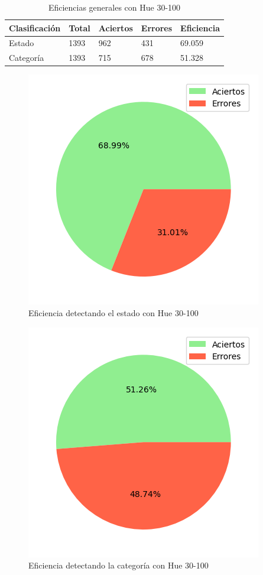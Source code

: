 \begin{table}[h!]
\centering
\begin{tabular}{|l|l|l|l|l|}
\hline 
\textbf{Clasificación} & \textbf{Total} & \textbf{Aciertos} & \textbf{Errores} & \textbf{Eficiencia} \\
\hline
Estado & 1393 & 962 & 431 & 69.059 \\
\hline 
Categoría & 1393 & 715 & 678 & 51.328 \\
\hline 
\end{tabular}
\caption{Eficiencias generales con Hue 30-100}
\label{table:efficiency_general_30_100}
\end{table}

\captionsetup[figure]{skip=-10pt}

\begin{figure}[H]
\centering
\includegraphics[scale=0.6]{images/result_global_state_30_100.png}
\caption{Eficiencia detectando el estado con Hue 30-100}
\label{img:efficiency_state_30_100}
\end{figure}

\begin{figure}
\centering
\includegraphics[scale=0.6]{images/result_global_class_30_100.png}
\caption{Eficiencia detectando la categoría con Hue 30-100}
\label{img:efficiency_category_30_100}
\end{figure}


